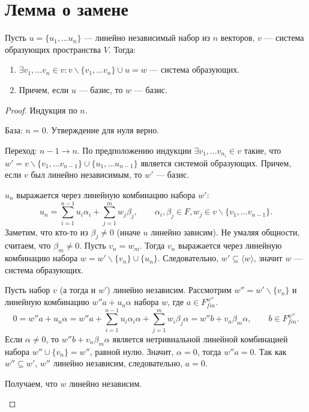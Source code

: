 \documentclass[11pt]{book}
\theoremstyle{definition}
\theoremstyle{plain}
\theoremstyle{plain}
\theoremstyle{definition}
\theoremstyle{remark}
\begin{document}
\section{Лемма о замене}
\begin{thm}\label{lm_zam}
    Пусть $ u = \{u_1, \ldots u_n\}$ --- линейно  независимый набор из  $ n$ векторов, $ v$ --- система образующих пространства  $ V$.
    Тогда:
    \begin{enumerate}[noitemsep]
	\item $ \exists v_1, \ldots v_n \in v: v \smallsetminus \{v_1, \ldots v_n\} \cup u = w$ --- система образующих.
	\item Причем, если  $ u$ --- базис, то $ w$ --- базис.
    \end{enumerate}
\end{thm}
\begin{proof}
    Индукция по $ n$.
    \begin{description}
	\item База: $ n = 0$.  Утверждение для нуля верно.
	\item Переход:  $ n-1 \to  n$. По предположению индукции $ \exists v_1, \ldots v_{n_i} \in v$ такие, что $ w' = v \smallsetminus \{v_1, \ldots v_{n-1}\} \cup \{u_1, \ldots u_{n-1}\}$ является системой образующих. Причем, если $ v$ был линейно независимым, то  $ w'$ --- базис.

	    $ u_n$ выражается через линейную комбинацию набора  $ w'$:  \[
		u_n =	      \sum_{i=1}^{n-1} u_i \alpha_i + \sum _{j=1}^{m} w_{j}\beta_j, \qquad \alpha_i, \beta_j \in F, w_j \in v \smallsetminus \{v_1, \ldots v_{n-1}\}
	    .\]
	    Заметим, что кто-то из $ \beta_j \ne 0$ (иначе $ u$ линейно зависим).
	    Не умаляя общности, считаем, что $ \beta_m \ne 0$.  Пусть $ v_n = w_m$. Тогда  $ v_n$ выражается через линейную комбинацию набора  $ w = w' \smallsetminus \{v_n\} \cup \{u_n\}$. Следовательно, $ w' \subseteq \langle w \rangle$, значит $ w$ --- система образующих.

	    Пусть набор  $ v$ (а тогда и  $ w'$) линейно независим. Рассмотрим  $ w'' = w' \smallsetminus \{v_n\}$ и линейную комбинацию $ w'' a + u_n \alpha $ набора  $ w$, где  $ a \in F_{fin}^{w''}$.
	    \[
		0 = w'' a + u_n \alpha = w''a + \sum _{i=1}^{n-1} u_i \alpha_i \alpha + \sum _{j= 1}^{m} w_i \beta_j \alpha = w'' b + v_n \beta_m \alpha, \qquad b \in F_{fin}^{w''}
	    .\]
	    Если $ \alpha \ne 0$, то $ w''b + v_n \beta_m \alpha$ является нетривиальной линейной комбинацией набора  $ w'' \cup \{v_n\} = w''$, равной нулю. Значит,  $ \alpha =0$, тогда $ w''a = 0$. Так как  $ w'' \subseteq w'$, $ w''$ линейно независим, следовательно,  $ a = 0$.

	    Получаем, что  $ w$  линейно независим.
    \end{description}
\end{proof}
\end{document}
